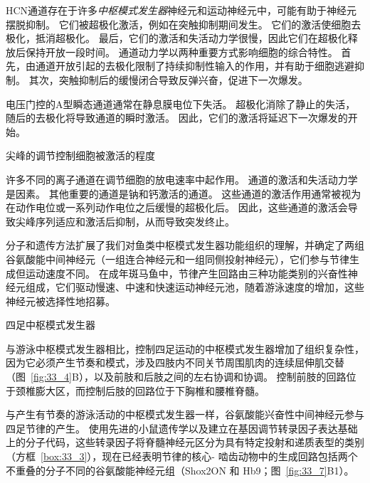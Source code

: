 \begin{proposition}[神经元离子通道有助于中枢模式发生器功能]
	\quad \quad HCN通道存在于许多\textit{中枢模式发生器}神经元和运动神经元中，可能有助于神经元摆脱抑制。
	它们被超极化激活，例如在突触抑制期间发生。
	它们的激活使细胞去极化，抵消超极化。
	最后，它们的激活和失活动力学很慢，因此它们在超极化释放后保持开放一段时间。
	通道动力学以两种重要方式影响细胞的综合特性。
	首先，由通道开放引起的去极化限制了持续抑制性输入的作用，并有助于细胞逃避抑制。
	其次，突触抑制后的缓慢闭合导致反弹兴奋，促进下一次爆发。
	
	\quad \quad 电压门控的A型瞬态通道通常在静息膜电位下失活。
	超极化消除了静止的失活，随后的去极化将导致通道的瞬时激活。
	因此，它们的激活将延迟下一次爆发的开始。
	
	\quad \quad 尖峰的调节控制细胞被激活的程度
	
	\quad \quad 许多不同的离子通道在调节细胞的放电速率中起作用。
	通道的激活和失活动力学是因素。
	其他重要的通道是钠和钙激活的通道。
	这些通道的激活作用通常被视为在动作电位或一系列动作电位之后缓慢的超极化后。
	因此，这些通道的激活会导致尖峰序列适应和激活后抑制，从而导致突发终止。
	
\end{proposition}


分子和遗传方法扩展了我们对鱼类中枢模式发生器功能组织的理解，并确定了两组谷氨酸能中间神经元（一组连合神经元和一组同侧投射神经元），它们参与节律生成但运动速度不同。
在成年斑马鱼中，节律产生回路由三种功能类别的兴奋性神经元组成，它们驱动慢速、中速和快速运动神经元池，随着游泳速度的增加，这些神经元被选择性地招募。


四足中枢模式发生器

与游泳中枢模式发生器相比，控制四足运动的中枢模式发生器增加了组织复杂性，因为它必须产生节奏和模式，涉及四肢内不同关节周围肌肉的连续屈伸肌交替（图~\ref{fig:33_4}B），以及前肢和后肢之间的左右协调和协调。
控制前肢的回路位于颈椎膨大区，而控制后肢的回路位于下胸椎和腰椎脊髓。


与产生有节奏的游泳活动的中枢模式发生器一样，谷氨酸能兴奋性中间神经元参与四足节律的产生。
使用先进的小鼠遗传学以及建立在基因调节转录因子表达基础上的分子代码，这些转录因子将脊髓神经元区分为具有特定投射和递质表型的类别（方框~\ref{box:33_3}），现在已经表明节律的核心- 啮齿动物中的生成回路包括两个不重叠的分子不同的谷氨酸能神经元组（Shox2ON 和 Hb9；图~\ref{fig:33_7}B1）。



